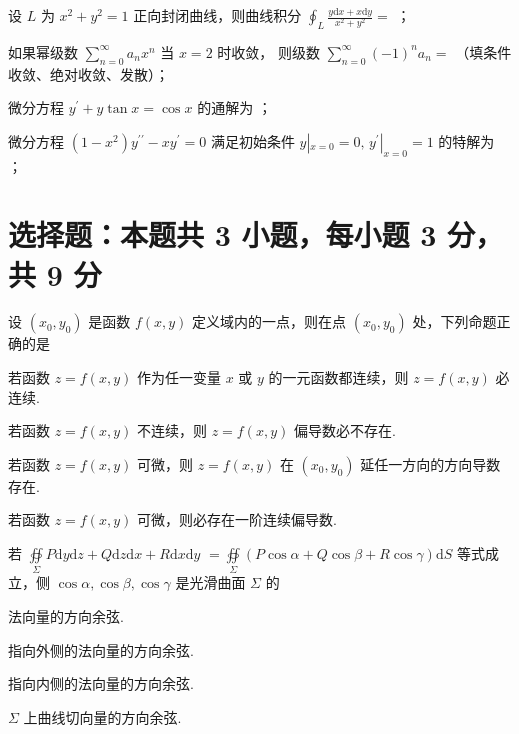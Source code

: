 \begin{question}[points = 3]
    设 $L$ 为 $x^2 + y^2 = 1$ 正向封闭曲线，则曲线积分 $\oint_L \frac{y\mathrm{d}x + x\mathrm{d}y}{x^2 + y^2} = $ \fillin[]；
\end{question}

\begin{question}[points = 3]
    如果幂级数 $\sum\limits_{n = 0}^{\infty} a_nx^n$ 当 $x = 2$ 时收敛，
    则级数 $\sum\limits_{n = 0}^{\infty} (-1)^na_n = $ \fillin[] （填条件收敛、绝对收敛、发散）；
\end{question}

\begin{question}[points = 3]
    微分方程 $y^{\prime} + y\tan{x} = \cos{x}$ 的通解为 \fillin[]；
\end{question}

\begin{question}[points = 3]
    微分方程 $(1 - x^2)y^{\prime\prime} - xy^{\prime} = 0$ 满足初始条件
    $y|_{x = 0} = 0,\, y^{\prime}|_{x = 0} = 1$ 的特解为 \fillin[]；
\end{question}

\section{选择题：本题共 3 小题，每小题 3 分，共 9 分}

\begin{question}[points = 3]
    设 $(x_0, y_0)$ 是函数 $f(x, y)$ 定义域内的一点，则在点 $(x_0, y_0)$ 处，下列命题正确的是 \paren[]
\end{question}
\begin{choices}
    \item 若函数 $z = f(x, y)$ 作为任一变量 $x$ 或 $y$ 的一元函数都连续，则 $z = f(x, y)$ 必连续.
    \item 若函数 $z = f(x, y)$ 不连续，则 $z = f(x, y)$ 偏导数必不存在.
    \item 若函数 $z = f(x, y)$ 可微，则 $z = f(x, y)$ 在 $(x_0, y_0)$ 延任一方向的方向导数存在.
    \item 若函数 $z = f(x, y)$ 可微，则必存在一阶连续偏导数.
\end{choices}

\begin{question}[points = 3]
    若 $\oiint\limits_\Sigma P\mathrm{d}y\mathrm{d}z + Q\mathrm{d}z\mathrm{d}x + R\mathrm{d}x\mathrm{d}y$
    $= \oiint\limits_\Sigma (P\cos{\alpha} + Q\cos{\beta} + R\cos{\gamma})\mathrm{d}S$ 等式成立，侧 $\cos{\alpha}, \cos{\beta}, \cos{\gamma}$ 是光滑曲面 $\Sigma$ 的 \paren[]
\end{question}
\begin{choices}
    \item 法向量的方向余弦.
    \item 指向外侧的法向量的方向余弦.
    \item 指向内侧的法向量的方向余弦.
    \item $\Sigma$ 上曲线切向量的方向余弦.
\end{choices}

